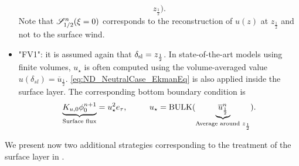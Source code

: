 \begin{itemize}
\begin{equation}
{			z_{\frac{1}{2}}}).
	\end{equation}
		  Note that ${\cal S}_{1/2}^{n}(\xi=0)$ corresponds
		  to the reconstruction of $u(z)$ at
		  $z_{\frac{1}{2}}$ and not to the surface wind.
	  \item "FV1": it is assumed again that
		  $\delta_{\rm sl} = z_{\frac{1}{2}}$.
		  In state-of-the-art models using finite volumes,
		  $u_{\star}$ is often computed using the
		  volume-averaged value
		  $u(\delta_{sl}) = \overline{u}_{\frac{1}{2}}$.
		  \eqref{eq:ND_NeutralCase_EkmanEq} is
		  also applied inside the surface layer.
		The corresponding bottom boundary condition is
		  \begin{equation}
		\underbrace{K_{u,0} \phi_0^{n+1}}_{\text{Surface flux}}
		= u_\star^2 e_\tau, ~~~~~~~~
			u_\star = {\rm BULK}(
			\underbrace{\overline{u}^{n}_{\frac{1}{2}}}_{
				\text{Average around }
			z_{\frac{1}{2}}}).
		  \end{equation}
\end{itemize}
We present now two additional strategies corresponding to
the treatment of the surface layer in \citep{nishizawa_surface_2018}.

